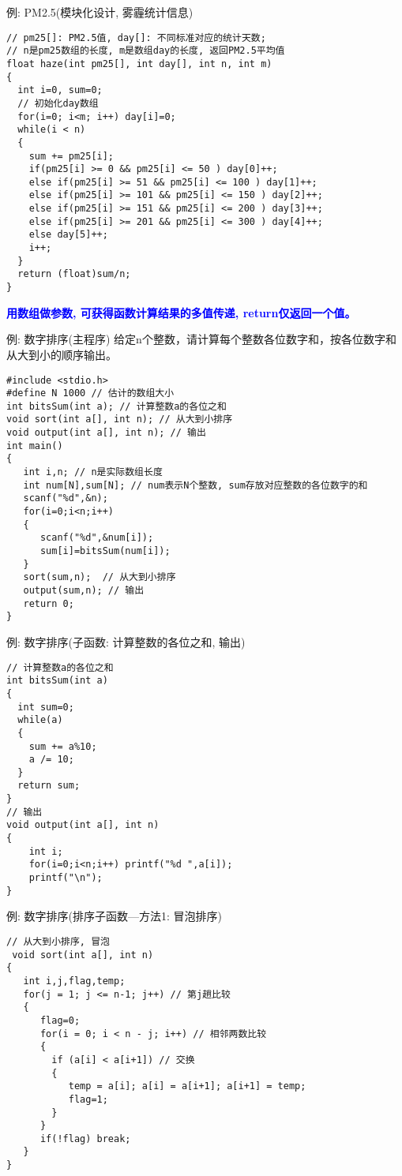 \begin{frame}{例: PM2.5(模块化设计, 雾霾统计信息)}
\begin{lstlisting}
// pm25[]: PM2.5值, day[]: 不同标准对应的统计天数; 
// n是pm25数组的长度, m是数组day的长度, 返回PM2.5平均值
float haze(int pm25[], int day[], int n, int m)
{
  int i=0, sum=0;
  // 初始化day数组
  for(i=0; i<m; i++) day[i]=0;
  while(i < n) 
  {
    sum += pm25[i];
    if(pm25[i] >= 0 && pm25[i] <= 50 ) day[0]++;
    else if(pm25[i] >= 51 && pm25[i] <= 100 ) day[1]++;
    else if(pm25[i] >= 101 && pm25[i] <= 150 ) day[2]++;
    else if(pm25[i] >= 151 && pm25[i] <= 200 ) day[3]++;
    else if(pm25[i] >= 201 && pm25[i] <= 300 ) day[4]++;
    else day[5]++;
    i++;
  } 
  return (float)sum/n;
} 
\end{lstlisting}
\textbf{\textcolor{blue}{用数组做参数, 可获得函数计算结果的多值传递, return仅返回一个值。}}
\end{frame}

\begin{frame}{例: 数字排序(主程序)}
给定n个整数，请计算每个整数各位数字和，按各位数字和从大到小的顺序输出。
\begin{lstlisting}
#include <stdio.h>
#define N 1000 // 估计的数组大小
int bitsSum(int a); // 计算整数a的各位之和
void sort(int a[], int n); // 从大到小排序
void output(int a[], int n); // 输出
int main()
{
   int i,n; // n是实际数组长度 
   int num[N],sum[N]; // num表示N个整数, sum存放对应整数的各位数字的和  
   scanf("%d",&n);
   for(i=0;i<n;i++) 
   {
      scanf("%d",&num[i]); 
      sum[i]=bitsSum(num[i]);
   }
   sort(sum,n);  // 从大到小排序
   output(sum,n); // 输出
   return 0;
}
\end{lstlisting}
\end{frame}

\begin{frame}{例: 数字排序(子函数: 计算整数的各位之和, 输出)}
\begin{lstlisting}
// 计算整数a的各位之和
int bitsSum(int a)
{
  int sum=0;
  while(a)
  {
    sum += a%10;
    a /= 10;
  }
  return sum;
}
// 输出
void output(int a[], int n)
{
    int i;
    for(i=0;i<n;i++) printf("%d ",a[i]);
    printf("\n");
}
\end{lstlisting}
\end{frame}

\begin{frame}{例: 数字排序(排序子函数---方法1: 冒泡排序)}
\begin{lstlisting}
// 从大到小排序, 冒泡
 void sort(int a[], int n)
{
   int i,j,flag,temp;
   for(j = 1; j <= n-1; j++) // 第j趟比较
   {
      flag=0;
      for(i = 0; i < n - j; i++) // 相邻两数比较
      {
        if (a[i] < a[i+1]) // 交换
        { 
           temp = a[i]; a[i] = a[i+1]; a[i+1] = temp; 
           flag=1;
        }
      }
      if(!flag) break;
   }
}
\end{lstlisting}
\end{frame}

